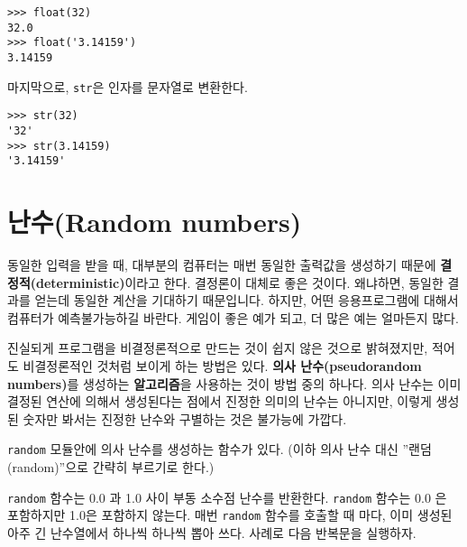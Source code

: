 \beforeverb
\begin{verbatim}
>>> float(32)
32.0
>>> float('3.14159')
3.14159
\end{verbatim}
\afterverb
%

마지막으로, {\tt str}은 인자를 문자열로 변환한다.


\beforeverb
\begin{verbatim}
>>> str(32)
'32'
>>> str(3.14159)
'3.14159'
\end{verbatim}
\afterverb
%

\section{난수(Random numbers)}


동일한 입력을 받을 때, 대부분의 컴퓨터는 매번 동일한 출력값을 생성하기 때문에 {\bf 결정적(deterministic)}이라고 한다.
결정론이 대체로 좋은 것이다. 왜냐하면, 동일한 결과를 얻는데 동일한 계산을 기대하기 때문입니다. 
하지만, 어떤 응용프로그램에 대해서 컴퓨터가 예측불가능하길 바란다. 
게임이 좋은 예가 되고, 더 많은 예는 얼마든지 많다.

진실되게 프로그램을 비결정론적으로 만드는 것이 쉽지 않은 것으로 밝혀졌지만, 
적어도 비결정론적인 것처럼 보이게 하는 방법은 있다. 
{\bf 의사 난수(pseudorandom numbers)}를 생성하는 {\bf 알고리즘}을 사용하는 것이 방법 중의 하나다. 
의사 난수는 이미 결정된 연산에 의해서 생성된다는 점에서 진정한 의미의 난수는 아니지만, 
이렇게 생성된 숫자만 봐서는 진정한 난수와 구별하는 것은 불가능에 가깝다.


{\tt random} 모듈안에 의사 난수를 생성하는 함수가 있다. 
(이하 의사 난수 대신 ''랜덤(random)''으로 간략히 부르기로 한다.)


{\tt random} 함수는 0.0 과 1.0 사이 부동 소수점 난수를 반환한다. {\tt random} 함수는 0.0 은 포함하지만 1.0은 포함하지 않는다.
매번 {\tt random} 함수를 호출할 때 마다, 이미 생성된 아주 긴 난수열에서 하나씩 하나씩 뽑아 쓰다. 
사례로 다음 반복문을 실행하자.


